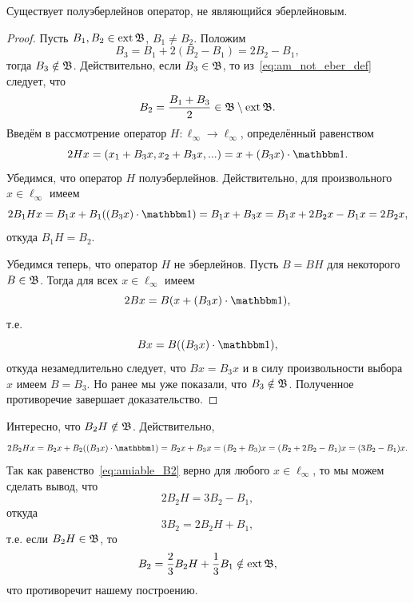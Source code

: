 \begin{theorem}
	\label{thm:amiable_but_not_Eberlein_exists}
	Существует полуэберлейнов оператор, не являющийся эберлейновым.
\end{theorem}

\begin{proof}
	Пусть $B_1, B_2 \in \operatorname{ext} \mathfrak{B}$, $B_1 \ne B_2$.
	Положим
	\begin{equation}
		\label{eq:am_not_eber_def}
		B_3 = B_1 + 2(B_2-B_1) = 2B_2-B_1,
	\end{equation}
	тогда $B_3 \notin \mathfrak{B}$.
	Действительно, если $B_3 \in \mathfrak{B}$, то из~\eqref{eq:am_not_eber_def} следует, что
	\begin{equation}
		B_2 = \frac{B_1 + B_3}2 \in \mathfrak{B} \setminus \operatorname{ext} \mathfrak{B}
		.
	\end{equation}
	Введём в рассмотрение оператор $H:\ell_\infty\to\ell_\infty$, определённый равенством
	\begin{equation}
		2Hx = (x_1 + B_3x, x_2 + B_3x, ...) = x + (B_3 x) \cdot \one
		.
	\end{equation}
	Убедимся, что оператор $H$ полуэберлейнов.
	Действительно, для произвольного $x\in\ell_\infty$ имеем
	\begin{equation}
		2 B_1 H x = B_1 x + B_1 ((B_3 x) \cdot\one) = B_1 x + B_3 x =
		B_1 x + 2 B_2 x - B_1 x = 2B_2 x
		,
	\end{equation}
	откуда $B_1 H = B_2$.

	Убедимся теперь, что оператор $H$ не эберлейнов.
	Пусть $B = BH$ для некоторого $B\in\mathfrak{B}$.
	Тогда для всех $x\in\ell_\infty$ имеем
	\begin{equation}
		2Bx = B (x + (B_3 x) \cdot \one)
		,
	\end{equation}
	т.е.
	\begin{equation}
		Bx =  B((B_3 x) \cdot \one)
		,
	\end{equation}
	откуда незамедлительно следует, что $Bx = B_3x$ и в силу произвольности выбора $x$ имеем $B=B_3$.
	Но ранее мы уже показали, что $B_3\notin \mathfrak{B}$.
	Полученное противоречие завершает доказательство.
\end{proof}

\begin{remark}
	Интересно, что $B_2H\notin \mathfrak{B}$.
	Действительно,
	\begin{equation}
		\label{eq:amiable_B2}
		2B_2 H x = B_2 x + B_2((B_3 x)\cdot \one) = B_2 x + B_3 x  =
		(B_2 + B_3) x  = (B_2+2B_2-B_1)x = (3B_2-B_1)x
		.
	\end{equation}
	Так как равенство~\eqref{eq:amiable_B2} верно для любого $x\in\ell_\infty$,
	то мы можем сделать вывод, что
	\begin{equation}
		2B_2H = 3B_2-B_1
		,
	\end{equation}
	откуда
	\begin{equation}
		3B_2 = 2B_2H  + B_1
		,
	\end{equation}
	т.е. если $B_2H\in\mathfrak{B}$, то
	\begin{equation}
		B_2 = \frac23 B_2H  + \frac13 B_1 \notin \operatorname{ext}\mathfrak{B}
		,
	\end{equation}
	что противоречит нашему построению.
\end{remark}

